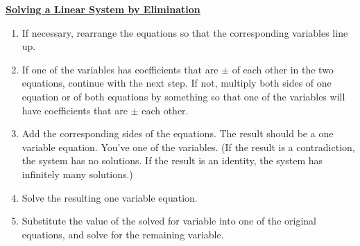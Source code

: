 \begin{definition}
	\textbf{\underline{Solving a Linear System by Elimination}}\\
	\bigskip
	\begin{enumerate}
		\item If necessary, rearrange the equations so that the corresponding variables line up.
		\item If one of the variables has coefficients that are $\pm$ of each other in the two equations, continue with the next step. If not, multiply both sides of one equation or of both equations
		by something so that one of the variables will have coefficients that are $\pm$ each other.
		\item Add the corresponding sides of the equations. The result should be a one variable equation. You’ve  one of the variables. (If the result is a contradiction, the system has no solutions. If the result is an identity, the system has infinitely many solutions.)
		\item Solve the resulting one variable equation.
		\item Substitute the value of the solved for variable into one of the original equations, and solve for the remaining variable.
	\end{enumerate}
\end{definition}


